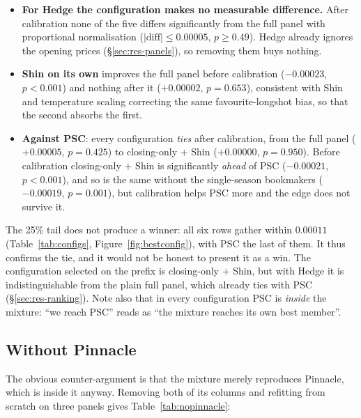 \documentclass[12pt,a4paper,oneside]{report}
\renewcommand{\_}{\oldunderscore\allowbreak}
\theoremstyle{definition}
\theoremstyle{plain}
\theoremstyle{definition}   %
\begin{document}
\begin{itemize}
  \item \textbf{For Hedge the configuration makes no measurable difference.} After calibration
        none of the five differs significantly from the full panel with proportional
        normalisation ($|\text{diff}|\leq0.00005$, $p\geq0.49$). Hedge already ignores the opening
        prices (\S\ref{sec:res-panels}), so removing them buys nothing.
  \item \textbf{Shin on its own} improves the full panel before calibration ($-0.00023$,
        $p<0.001$) and nothing after it ($+0.00002$, $p=0.653$), consistent with Shin and
        temperature scaling correcting the same favourite-longshot bias, so that the second
        absorbs the first.
  \item \textbf{Against PSC}: every configuration \emph{ties} after calibration, from the full panel
        ($+0.00005$, $p=0.425$) to closing-only $+$ Shin ($+0.00000$, $p=0.950$). Before
        calibration closing-only $+$ Shin is significantly \emph{ahead} of PSC ($-0.00021$,
        $p<0.001$), and so is the same without the single-season bookmakers ($-0.00019$,
        $p=0.001$), but calibration helps PSC more and the edge does not survive it.
\end{itemize}

The 25\% tail does not produce a winner: all six rows gather within $0.00011$
(Table~\ref{tab:configs}, Figure~\ref{fig:bestconfig}), with PSC the last of them. It thus
confirms the tie, and it would not be honest to present it as a win. The configuration selected on
the prefix is closing-only $+$ Shin, but with Hedge it is indistinguishable from the plain full
panel, which already ties with PSC (\S\ref{sec:res-ranking}). Note also that in every
configuration PSC is \emph{inside} the mixture: ``we reach PSC'' reads as ``the mixture reaches
its own best member''.

\subsection{Without Pinnacle}
\label{sec:res-nopinnacle}

The obvious counter-argument is that the mixture merely reproduces Pinnacle, which is inside it
anyway. Removing both of its columns and refitting from scratch on three panels gives Table~\ref{tab:nopinnacle}:
\end{document}
